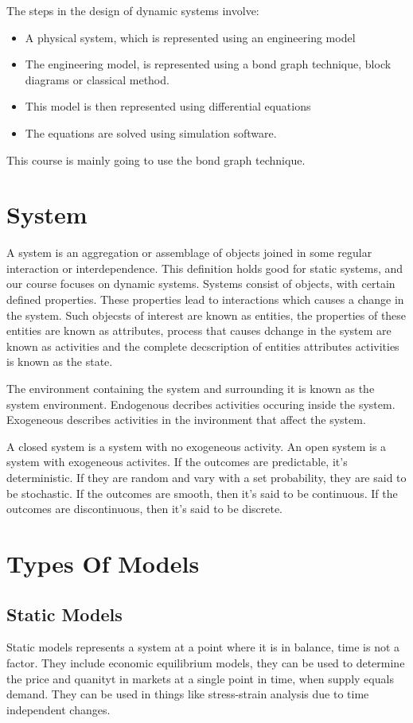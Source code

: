 \documentclass[twoside]{report}
\begin{document}
The steps in the design of dynamic systems involve:
\begin{itemize}
	\item A physical system, which is represented using an engineering model
	\item The engineering model, is represented using a bond graph technique, block diagrams or classical method.
	\item This model is then represented using differential equations
	\item The equations are solved using simulation software.
\end{itemize}
This course is mainly going to use the bond graph technique.
\section{System}
A system is an aggregation or assemblage of objects joined in some regular interaction or interdependence. This definition holds good for static systems, and our course focuses on dynamic systems. Systems consist of objects, with certain defined properties. These properties lead to interactions which causes a change in the system. Such objecsts of interest are known as entities, the properties of these entities are known as attributes, process that causes dchange in the system are known as activities and the complete decscription of entities attributes activities is known as the state.

The environment containing the system and surrounding it is known as the system environment. Endogenous decribes activities occuring inside the system. Exogeneous describes activities in the invironment that affect the system.

A closed system is a system with no exogeneous activity. An open system is a system with exogeneous activites. If the outcomes are predictable, it's deterministic. If they are random and vary with a set probability, they are said to be stochastic. If the outcomes  are smooth, then it's said to be continuous. If the outcomes  are discontinuous, then it's said to be discrete.

\section{Types Of Models}
\subsection{Static Models}
Static models represents a system at a point where it is in balance, time is not a factor.
They include economic equilibrium models, they can be used to determine the price and quanityt in markets at a single point in time, when supply equals demand.
They can be used in things like stress-strain analysis due to time independent changes.
\end{document}
